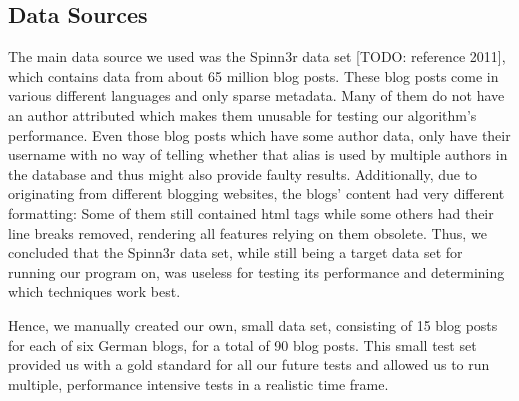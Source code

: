 
\subsection{Data Sources}
\label{sec:data_sources}


The main data source we used was the Spinn3r data set [TODO: reference 2011], which contains data from about 65 million blog posts.
These blog posts come in various different languages and only sparse metadata.
Many of them do not have an author attributed which makes them unusable for testing our algorithm's performance.
Even those blog posts which have some author data, only have their username with no way of telling whether that alias is used by multiple authors in the database and thus might also provide faulty results.
Additionally, due to originating from different blogging websites, the blogs' content had very different formatting: Some of them still contained html tags while some others had their line breaks removed, rendering all features relying on them obsolete. %
Thus, we concluded that the Spinn3r data set, while still being a target data set for running our program on, was useless for testing its performance and determining which techniques work best.


Hence, we manually created our own, small data set, consisting of 15 blog posts for each of six German blogs, for a total of 90 blog posts.
This small test set provided us with a gold standard for all our future tests and allowed us to run multiple, performance intensive tests in a realistic time frame.